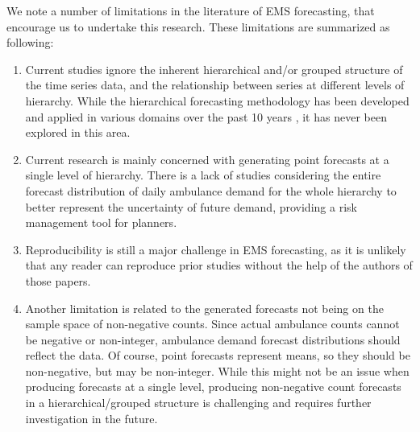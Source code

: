 \documentclass[
  authoryear,
  preprint,
  3p]{elsarticle}
\begin{document}
We note a number of limitations in the literature of EMS forecasting,
that encourage us to undertake this research. These limitations are
summarized as following:

\begin{enumerate}
\def\labelenumi{\arabic{enumi}.}
\item
  Current studies ignore the inherent hierarchical and/or grouped
  structure of the time series data, and the relationship between series
  at different levels of hierarchy. While the hierarchical forecasting
  methodology has been developed and applied in various domains over the
  past 10 years \citep{panagiotelis2022probabilistic}, it has never been
  explored in this area.
\item
  Current research is mainly concerned with generating point forecasts
  at a single level of hierarchy. There is a lack of studies considering
  the entire forecast distribution of daily ambulance demand for the
  whole hierarchy to better represent the uncertainty of future demand,
  providing a risk management tool for planners.
\item
  Reproducibility is still a major challenge in EMS forecasting, as it
  is unlikely that any reader can reproduce prior studies without the
  help of the authors of those papers.
\item
  Another limitation is related to the generated forecasts not being on
  the sample space of non-negative counts. Since actual ambulance counts
  cannot be negative or non-integer, ambulance demand forecast
  distributions should reflect the data. Of course, point forecasts
  represent means, so they should be non-negative, but may be
  non-integer. While this might not be an issue when producing forecasts
  at a single level, producing non-negative count forecasts in a
  hierarchical/grouped structure is challenging and requires further
  investigation in the future.
\end{enumerate}
\end{document}
